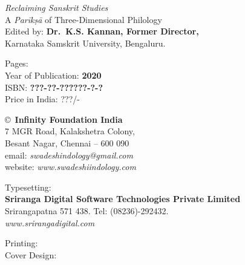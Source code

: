 \thispagestyle{empty}

\noindent
{\fontsize{9}{11}\selectfont\sl Reclaiming Sanskrit Studies}\\
A \textit{Parīkṣā} of Three-Dimensional Philology\\
Edited by: {\bf Dr.\ K.S. Kannan, Former Director,}\\
Karnataka Samskrit University, Bengaluru.\\
\vfill

\noindent
Pages: {\bf\pageref{bookend}}\\
Year of Publication: {\bf 2020}\\
ISBN: {\bf ???-??-??????-?-?}\\
Price in India: ???/-
\vfill

\noindent
\copyright\ {\bf Infinity Foundation India}\\ 
7 MGR Road, Kalakshetra Colony,\\ 
Besant Nagar, Chennai -- 600 090\\
email: {\sl swadeshindology@gmail.com}\\
website: {\sl www.swadeshiindology.com} 
\vfill

\noindent
Typesetting:\\ 
{\bf Sriranga Digital Software Technologies Private Limited}\\ 
Srirangapatna 571 438. Tel: (08236)-292432.\\
{\sl www.srirangadigital.com}
\vfill

\noindent
Printing:\\

\noindent
Cover Design:\\ 
